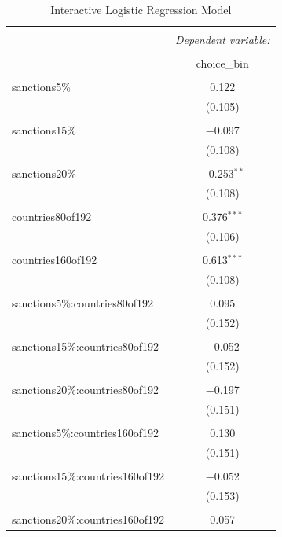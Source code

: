 \documentclass[12pt,letterpaper]{article}
\begin{document}
\begin{enumerate}
\begin{enumerate}
\begin{itemize}
 
			\begin{table} \centering 
				\caption{Interactive Logistic Regression Model} 
				\label{} 
				\begin{tabular}{@{\extracolsep{5pt}}lc} 
					\\[-1.8ex]\hline 
					\hline \\[-1.8ex] 
					& \multicolumn{1}{c}{\textit{Dependent variable:}} \\ 
					\cline{2-2} 
					\\[-1.8ex] & choice\_bin \\ 
					\hline \\[-1.8ex] 
					sanctions5\% & 0.122 \\ 
					& (0.105) \\ 
					& \\ 
					sanctions15\% & $-$0.097 \\ 
					& (0.108) \\ 
					& \\ 
					sanctions20\% & $-$0.253$^{**}$ \\ 
					& (0.108) \\ 
					& \\ 
					countries80of192 & 0.376$^{***}$ \\ 
					& (0.106) \\ 
					& \\ 
					countries160of192 & 0.613$^{***}$ \\ 
					& (0.108) \\ 
					& \\ 
					sanctions5\%:countries80of192 & 0.095 \\ 
					& (0.152) \\ 
					& \\ 
					sanctions15\%:countries80of192 & $-$0.052 \\ 
					& (0.152) \\ 
					& \\ 
					sanctions20\%:countries80of192 & $-$0.197 \\ 
					& (0.151) \\ 
					& \\ 
					sanctions5\%:countries160of192 & 0.130 \\ 
					& (0.151) \\ 
					& \\ 
					sanctions15\%:countries160of192 & $-$0.052 \\ 
					& (0.153) \\ 
					& \\ 
					sanctions20\%:countries160of192 & 0.057 \\ 

\end{tabular}
\end{table}
\end{itemize}
\end{enumerate}
\end{enumerate}
\end{document}
